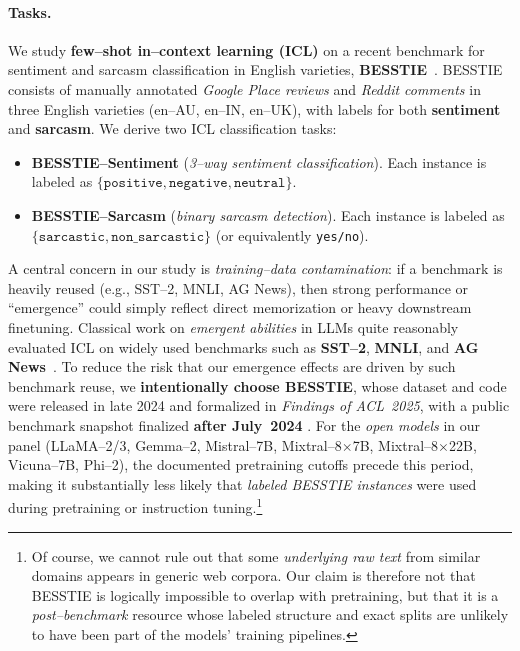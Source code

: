 \paragraph{Tasks.}
We study \textbf{few--shot in--context learning (ICL)} on a recent
benchmark for sentiment and sarcasm classification in English varieties,
\textbf{BESSTIE}~\citep{srirag2025besstie}. BESSTIE consists of
manually annotated \emph{Google Place reviews} and \emph{Reddit
comments} in three English varieties (en--AU, en--IN, en--UK), with
labels for both \textbf{sentiment} and \textbf{sarcasm}. We derive two
ICL classification tasks:
\begin{itemize}[leftmargin=1.5em]
  \item \textbf{BESSTIE--Sentiment} (\emph{3--way sentiment
        classification}). Each instance is labeled as
        $\{\texttt{positive},\texttt{negative},\texttt{neutral}\}$.
  \item \textbf{BESSTIE--Sarcasm} (\emph{binary sarcasm detection}).
        Each instance is labeled as
        $\{\texttt{sarcastic},\texttt{non\_sarcastic}\}$ (or
        equivalently \texttt{yes/no}).
\end{itemize}

A central concern in our study is \emph{training--data contamination}:
if a benchmark is heavily reused (e.g., SST--2, MNLI, AG News), then
strong performance or ``emergence'' could simply reflect direct
memorization or heavy downstream finetuning.
Classical work on \emph{emergent abilities} in LLMs quite reasonably evaluated
ICL on widely used benchmarks such as \textbf{SST--2}, \textbf{MNLI},
and \textbf{AG News}~\citep{socher2013sst,zhang2015character,
williams2018broad,brown2020language,wei2022emergent}.
To reduce the risk that our emergence effects are driven by such
benchmark reuse, we \textbf{intentionally choose BESSTIE}, whose dataset
and code were released in late 2024 and formalized in \emph{Findings of ACL~2025},
with a public benchmark snapshot finalized \textbf{after July~2024}
\citep{srirag2025besstie}. For the \emph{open models} in our panel
(LLaMA--2/3, Gemma--2, Mistral--7B, Mixtral--8$\times$7B,
Mixtral--8$\times$22B, Vicuna--7B, Phi--2), the documented pretraining
cutoffs precede this period, making it substantially less likely that
\emph{labeled BESSTIE instances} were used during pretraining or
instruction tuning.\footnote{Of course, we cannot rule out that some
\emph{underlying raw text} from similar domains appears in generic web
corpora. Our claim is therefore not that BESSTIE is logically
impossible to overlap with pretraining, but that it is a
\emph{post--benchmark} resource whose labeled structure and exact splits
are unlikely to have been part of the models' training pipelines.}

